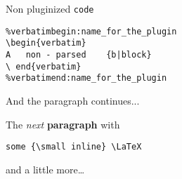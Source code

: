 
Non pluginized \texttt{code}
\begin{verbatim}
%verbatimbegin:name_for_the_plugin
\begin{verbatim}
A   non - parsed    {b|block}
\ end{verbatim}
%verbatimend:name_for_the_plugin
\end{verbatim}
And the paragraph continues...
     
The \emph{next} \textbf{paragraph} with
\begin{verbatim}
some {\small inline} \LaTeX
\end{verbatim}
and a little more\dots
